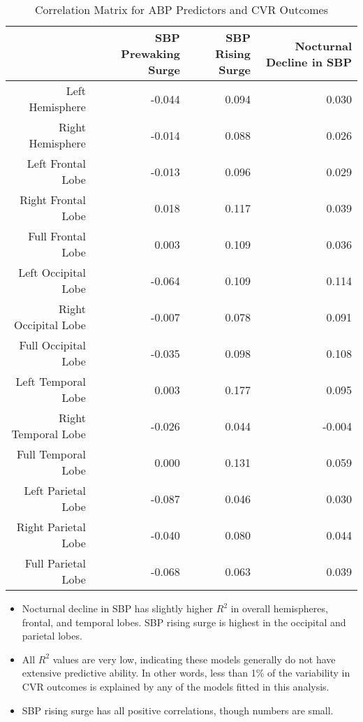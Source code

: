 \documentclass[10pt]{article}\usepackage[]{graphicx}\usepackage[]{color}
\begin{document}
\begin{table}[ht]
\centering
\caption{Correlation Matrix for ABP Predictors and CVR Outcomes} 
\begin{tabular}{rrrr}
  \toprule
 & SBP Prewaking Surge & SBP Rising Surge & Nocturnal Decline in SBP \\ 
  \midrule
Left Hemisphere & -0.044 & 0.094 & 0.030 \\ 
  Right Hemisphere & -0.014 & 0.088 & 0.026 \\ 
  Left Frontal Lobe & -0.013 & 0.096 & 0.029 \\ 
  Right Frontal Lobe & 0.018 & 0.117 & 0.039 \\ 
  Full Frontal Lobe & 0.003 & 0.109 & 0.036 \\ 
  Left Occipital Lobe & -0.064 & 0.109 & 0.114 \\ 
  Right Occipital Lobe & -0.007 & 0.078 & 0.091 \\ 
  Full Occipital Lobe & -0.035 & 0.098 & 0.108 \\ 
  Left Temporal Lobe & 0.003 & 0.177 & 0.095 \\ 
  Right Temporal Lobe & -0.026 & 0.044 & -0.004 \\ 
  Full Temporal Lobe & 0.000 & 0.131 & 0.059 \\ 
  Left Parietal Lobe & -0.087 & 0.046 & 0.030 \\ 
  Right Parietal Lobe & -0.040 & 0.080 & 0.044 \\ 
  Full Parietal Lobe & -0.068 & 0.063 & 0.039 \\ 
   \bottomrule
\end{tabular}
\end{table}


\begin{itemize}
  \item Nocturnal decline in SBP has slightly higher $R^2$ in overall hemispheres, frontal, and temporal lobes. SBP rising surge is highest in the occipital and parietal lobes.
  \item All $R^2$ values are very low, indicating these models generally do not have extensive predictive ability. In other words, less than 1\% of the variability in CVR outcomes is explained by any of the models fitted in this analysis.
  \item SBP rising surge has all positive correlations, though numbers are small.
\end{itemize}
\end{document}

